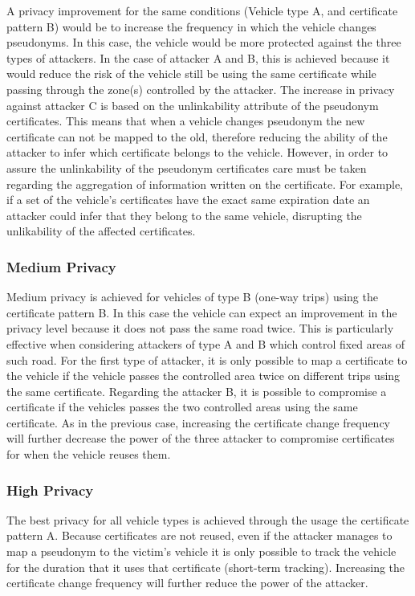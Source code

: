 			A privacy improvement for the same conditions (Vehicle type A, and certificate pattern B) would be to increase the frequency in which the vehicle changes pseudonyms. In this case, the vehicle would be more protected against the three types of attackers. In the case of attacker A and B, this is achieved because it would reduce the risk of the vehicle still be using the same certificate while passing through the zone(s) controlled by the attacker. The increase in privacy against attacker C is based on the unlinkability attribute of the pseudonym certificates. This means that when a vehicle changes pseudonym the new certificate can not be mapped to the old, therefore reducing the ability of the attacker to infer which certificate belongs to the vehicle. However, in order to assure the unlinkability of the pseudonym certificates care must be taken regarding the aggregation of information written on the certificate. For example, if a set of the vehicle's certificates have the exact same expiration date an attacker could infer that they belong to the same vehicle, disrupting the unlikability of the affected certificates. 
			
			\subsubsection{Medium Privacy}
			Medium privacy is achieved for vehicles of type B (one-way trips) using the certificate pattern B. In this case the vehicle can expect an improvement in the privacy level because it does not pass the same road twice. This is particularly effective when considering attackers of type A and B which control fixed areas of such road. For the first type of attacker, it is only possible to map a certificate to the vehicle if the vehicle passes the controlled area twice on different trips using the same certificate. Regarding the attacker B, it is possible to compromise a certificate if the vehicles passes the two controlled areas using the same certificate. As in the previous case, increasing the certificate change frequency will further decrease the power of the three attacker to compromise certificates for when the vehicle reuses them.
			
			
			\subsubsection{High Privacy}
			The best privacy for all vehicle types is achieved through the usage the certificate pattern A. Because certificates are not reused, even if the attacker manages to map a pseudonym to the victim's vehicle it is only possible to track the vehicle for the duration that it uses that certificate (short-term tracking). Increasing the certificate change frequency will further reduce the power of the attacker. 
			

